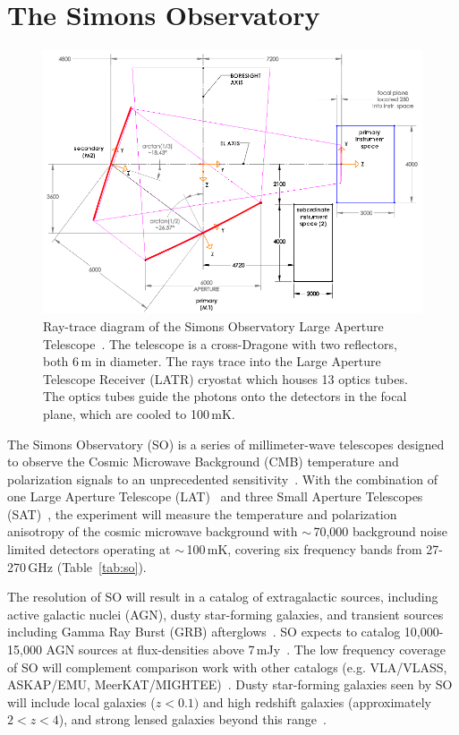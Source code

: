 \section{The Simons Observatory}

\begin{figure}[t]
    \centering
    \includegraphics[width = .95\textwidth]{Figures/LAT_rt.pdf}
    \caption{Ray-trace diagram of the Simons Observatory Large Aperture Telescope~\cite{Parshley_2018}.  The telescope is a cross-Dragone with two reflectors, both 6\,m in diameter.  The rays trace into the Large Aperture Telescope Receiver (LATR) cryostat which houses 13 optics tubes.  The optics tubes guide the photons onto the detectors in the focal plane, which are cooled to 100\,mK.}
    \label{fig:so_inst}
\end{figure}

The Simons Observatory (SO) is a series of millimeter-wave telescopes designed to observe the Cosmic Microwave Background (CMB) temperature and polarization signals to an unprecedented sensitivity~\cite{gali18, so19}. With the combination of one Large Aperture Telescope (LAT)~\cite{xu/etal:2020c, zhu18, orlo18, coppi/etal:2018} and three Small Aperture Telescopes (SAT)~\cite{ali20}, the experiment will measure the temperature and polarization anisotropy of the cosmic microwave background with $\sim$\,70,000 background noise limited detectors operating at $\sim$\,100\,mK, covering six frequency bands from 27-270\,GHz (Table~\ref{tab:so}).

The resolution of SO will result in a catalog of extragalactic sources, including active galactic nuclei (AGN), dusty star-forming galaxies, and transient sources including Gamma Ray Burst (GRB) afterglows~\cite{so_science}.  SO expects to catalog 10,000-15,000 AGN sources at flux-densities above 7\,mJy~\cite{Tucci_2011}.  The low frequency coverage of SO will complement comparison work with other catalogs (e.g. VLA/VLASS, ASKAP/EMU, MeerKAT/MIGHTEE)~\cite{so_science}.  Dusty star-forming galaxies seen by SO will include local galaxies ($z<0.1)$ and high redshift galaxies (approximately $2<z<4$), and strong lensed galaxies beyond this range~\cite{Marrone_2017}.

